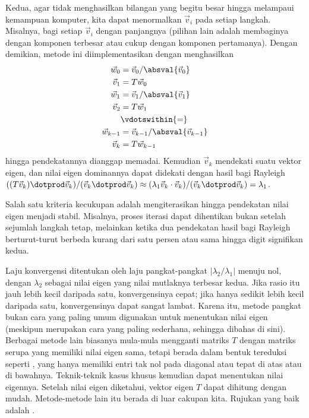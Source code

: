 Kedua, agar tidak menghasilkan bilangan yang begitu besar hingga melampaui
kemampuan komputer, kita dapat menormalkan $\vec{v}_i$ pada setiap langkah.
Misalnya, bagi setiap $\vec{v}_i$ dengan panjangnya (pilihan lain adalah
membaginya dengan komponen terbesar atau cukup dengan komponen pertamanya).
Dengan demikian, metode ini diimplementasikan dengan menghasilkan
\begin{align*}
  \vec{w}_0  &=\vec{v}_0/\absval{\vec{v}_0} \\
  \vec{v}_1  &=T\vec{w}_0                 \\
  \vec{w}_1  &=\vec{v}_1/\absval{\vec{v}_1} \\
  \vec{v}_2  &=T\vec{w}_1                 \\
             &\vdotswithin{=}    \\
  \vec{w}_{k-1}  &=\vec{v}_{k-1}/\absval{\vec{v}_{k-1}} \\
  \vec{v}_k  &=T\vec{w}_{k-1}                 
\end{align*}
hingga pendekatannya dianggap memadai. Kemudian $\vec{v}_k$ mendekati suatu
vektor eigen, dan nilai eigen dominannya dapat didekati dengan hasil bagi
Rayleigh %
$((T\vec{v}_k)\dotprod \vec{v}_k)/(\vec{v}_k\dotprod\vec{v}_k)
  \approx (\lambda_1\vec{v}_k\cdot\vec{v}_k)/(\vec{v}_k\dotprod\vec{v}_k)
  =\lambda_1$.


Salah satu kriteria kecukupan adalah mengiterasikan hingga pendekatan nilai
eigen menjadi stabil. Misalnya, proses iterasi dapat dihentikan bukan setelah
sejumlah langkah tetap, melainkan ketika dua pendekatan hasil bagi Rayleigh
berturut-turut berbeda kurang dari satu persen atau sama hingga digit signifikan
kedua.

Laju konvergensi ditentukan oleh laju pangkat-pangkat
$|\lambda_2/\lambda_1|$ menuju nol, dengan $\lambda_2$ sebagai nilai eigen
yang nilai mutlaknya terbesar kedua. Jika rasio itu jauh lebih kecil daripada
satu, konvergensinya cepat; jika hanya sedikit lebih kecil daripada satu,
konvergensinya dapat sangat lambat. Karena itu, metode pangkat bukan cara yang
paling umum digunakan untuk menentukan nilai eigen (meskipun merupakan cara
yang paling sederhana, sehingga dibahas di sini). Berbagai metode lain biasanya
mula-mula mengganti matriks $T$ dengan matriks serupa yang memiliki nilai eigen
sama, tetapi berada dalam bentuk tereduksi seperti
%
, yang hanya memiliki entri tak nol pada diagonal
atau tepat di atas atau di bawahnya. Teknik-teknik kasus khusus kemudian dapat
menentukan nilai eigennya. Setelah nilai eigen diketahui, vektor eigen $T$
dapat dihitung dengan mudah. Metode-metode lain itu berada di luar cakupan kita.
Rujukan yang baik adalah \cite{Goult}.



